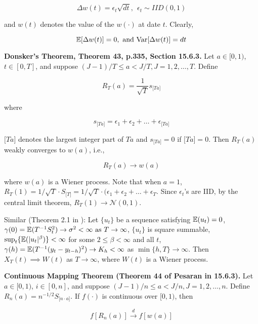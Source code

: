 \[
\Delta w(t) = \epsilon_t \sqrt{dt}, \ \ \epsilon_t \sim IID(0, 1)
\]

and \(w(t)\) denotes the value of the \(w(\cdot)\) at date \(t\). Clearly,

\[
\E[\Delta w(t)] = 0, \text{ and } \Var[ \Delta w(t)] = dt
\]

\begin{theorem}\label{stoch.donsker}\textbf{Donsker's Theorem, Theorem 43, p.335, Section 15.6.3.} Let \(a \in [0, 1)\), \(t \in [0, T]\), and suppose \((J - 1)/T \leq a < J/T, J = 1, 2, \ldots, T\). Define

\[
R_T(a) = \frac{1}{\sqrt{T}} s_{ \big[Ta \big] }
\]

where

\[
s_{ \big[Ta \big] } = \epsilon_1 + \epsilon_2 + \ldots + \epsilon_{ \big[Ta \big] }
\]

\(\big[Ta \big]\) denotes the largest integer part of \(Ta\) and \(s_{ \big[Ta \big] } = 0\) if \(\big[Ta \big] = 0\). Then \(R_T(a)\) weakly converges to \(w(a)\), i.e., 

\[
R_T(a) \to w(a)
\]

where \(w(a)\) is a Wiener process. Note that when \(a = 1\), \(R_T(1) = 1/\sqrt{T} \cdot S_{\big[T \big]} = 1/\sqrt{T} \cdot (\epsilon_1 + \epsilon_2 + \ldots + \epsilon_T\). Since \(\epsilon_t\)'s are IID, by the central limit theorem, \(R_T(1) \to \mathcal{N}(0, 1)\). 

\end{theorem}

Similar (Theorem 2.1 in \citet{Phillips1986}): Let \(\{u_t\}\) be a sequence satisfying \(\E(u_t) = 0\), \( \gamma(0) = \E(T^{-1}S_t ^2) \to \sigma^2 < \infty \text{ as } T \to \infty\), \(\{u_t\}\) is square summable, \(\sup_t \{ \E( |u_t|^\beta) \} < \infty\) for some \(2 \leq \beta < \infty\) and all \(t\), \(\gamma(h) = \E(T^{-1}(y_t - y_{t-h})^2) \to K_h < \infty\) as \(\min \{h, T\} \to \infty\). Then \(X_T(t) \implies W(t)\) as \(T \to \infty\), where \(W(t)\) is a Wiener process.

\begin{theorem}\label{stoch.cont.map} \textbf{Continuous Mapping Theorem (Theorem 44 of Pesaran in 15.6.3).} Let \(a \in [0, 1)\), \(i \in [0, n]\), and suppose \((J-1)/n \leq a < J/n, J = 1, 2, \ldots, n\). Define \(R_n(a) = n^{-1/2} S_{\big[ n \cdot a \big] }\). If \(f(\cdot)\) is continuous over \([0, 1)\), then 

\[
f[R_n(a)] \xrightarrow{d} f[w(a)]
\]

\end{theorem}


%
%
%
%
%
%
%
%
%
%



%
%
%





